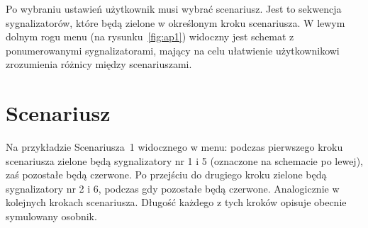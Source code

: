 Po wybraniu ustawień użytkownik musi wybrać scenariusz. Jest to sekwencja sygnalizatorów, które będą zielone w określonym kroku scenariusza. W lewym dolnym rogu menu (na rysunku~\ref{fig:ap1}) widoczny jest schemat z ponumerowanymi sygnalizatorami, mający na celu ułatwienie użytkownikowi zrozumienia różnicy między scenariuszami. 
\section*{Scenariusz} Na przykładzie Scenariusza~1 widocznego w menu: podczas pierwszego kroku scenariusza zielone będą sygnalizatory nr 1 i 5 (oznaczone na schemacie po lewej), zaś pozostałe będą czerwone. Po przejściu do drugiego kroku zielone będą sygnalizatory nr 2 i 6, podczas gdy pozostałe będą czerwone. Analogicznie w kolejnych krokach scenariusza. Długość każdego z tych kroków opisuje obecnie symulowany osobnik.
